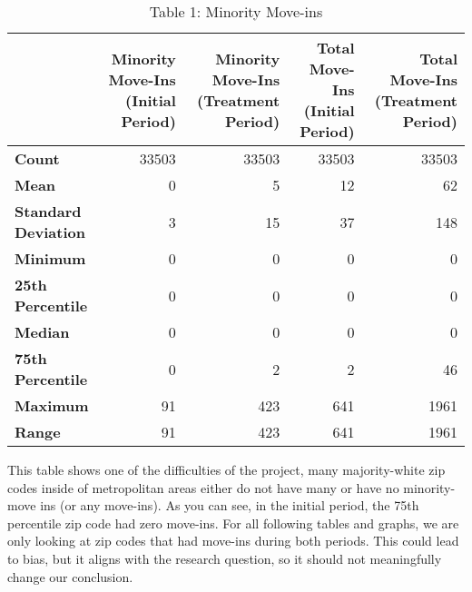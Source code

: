 \documentclass[11pt]{article}
\begin{document}
\begin{table}[H]
    \caption{Table 1: Minority Move-ins}
    \label{tab:summary_stats}
    \begin{tabular}{lrrrr}
    \toprule
     & Minority Move-Ins (Initial Period) & Minority Move-Ins (Treatment Period) & Total Move-Ins (Initial Period) & Total Move-Ins (Treatment Period) \\
    \midrule
    \textbf{Count} & 33503 & 33503 & 33503 & 33503 \\
    \textbf{Mean} & 0 & 5 & 12 & 62 \\
    \textbf{Standard Deviation} & 3 & 15 & 37 & 148 \\
    \textbf{Minimum} & 0 & 0 & 0 & 0 \\
    \textbf{25th Percentile} & 0 & 0 & 0 & 0 \\
    \textbf{Median} & 0 & 0 & 0 & 0 \\
    \textbf{75th Percentile} & 0 & 2 & 2 & 46 \\
    \textbf{Maximum} & 91 & 423 & 641 & 1961 \\
    \textbf{Range} & 91 & 423 & 641 & 1961 \\
    \bottomrule
    \end{tabular}
    \end{table}

    This table shows one of the difficulties of the project, many
majority-white zip codes inside of metropolitan areas either do not have
many or have no minority-move ins (or any move-ins). As you can see, in
the initial period, the 75th percentile zip code had zero move-ins. For
all following tables and graphs, we are only looking at zip codes that
had move-ins during both periods. This could lead to bias, but it aligns
with the research question, so it should not meaningfully change our
conclusion.
\end{document}

